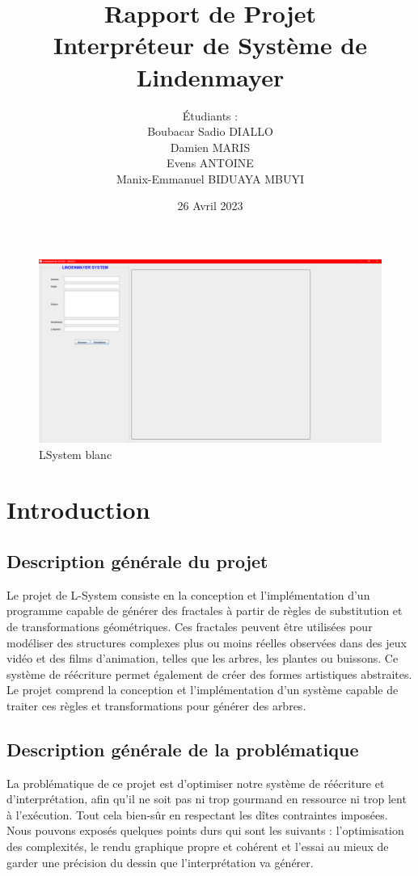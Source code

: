 \documentclass[12pt]{article}
\title{Rapport de Projet\\
Interpréteur de Système de Lindenmayer}
\author{Étudiants : \\ Boubacar Sadio DIALLO\\Damien MARIS\\Evens ANTOINE\\Manix-Emmanuel BIDUAYA MBUYI}
\date{26 Avril 2023}
\begin{document}
\maketitle
\thispagestyle{empty}
\newpage
\clearpage
{}


\tableofcontents
\newpage
\begin{figure}[htpb]
	\center
	\includegraphics[width=1\textwidth]{./images/LSystemVide.png}
	\caption{LSystem blanc\label{fig:figure1}}
\end{figure}

\section{Introduction}
\subsection{Description générale du projet}
Le projet de L-System consiste en la conception et l'implémentation d'un programme capable de générer des fractales à partir de règles de substitution et de transformations géométriques. Ces fractales peuvent être utilisées pour modéliser des structures complexes plus ou moins réelles observées dans des jeux vidéo et des films d'animation, telles que les arbres, les plantes ou buissons. Ce système de réécriture permet également de créer des formes artistiques abstraites. Le projet comprend la conception et l'implémentation d'un système capable de traiter ces règles et transformations pour générer des arbres.

\subsection{Description générale de la problématique}
La problématique de ce projet est d'optimiser notre système de réécriture et d'interprétation, afin qu'il ne soit pas ni trop gourmand en ressource ni trop lent à l'exécution. Tout cela bien-sûr en respectant les dîtes contraintes imposées. Nous pouvons exposés quelques points durs qui sont les suivants : l'optimisation des complexités, le rendu graphique propre et cohérent et l'essai au mieux de garder une précision du dessin que l'interprétation va générer.
\end{document}
